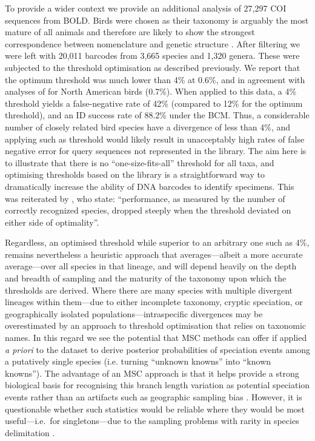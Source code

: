 \documentclass[12pt]{article}
\begin{document}
To provide a wider context we provide an additional analysis of 27,297 COI sequences from BOLD. Birds were chosen as their taxonomy is arguably the most mature of all animals and therefore are likely to show the strongest correspondence between nomenclature and genetic structure \citep{Hebert2004}. After filtering we were left with 20,011 barcodes from 3,665 species and 1,320 genera. These were subjected to the threshold optimisation as described previously. We report that the optimum threshold was much lower than 4\% at 0.6\%, and in agreement with analyses of \citep{Ratnasingham2013} for North American birds (0.7\%). When applied to this data, a 4\% threshold yields a false-negative rate of 42\% (compared to 12\% for the optimum threshold), and an ID success rate of 88.2\% under the BCM. Thus, a considerable number of closely related bird species have a divergence of less than 4\%, and applying such as threshold would likely result in unacceptably high rates of false negative error for query sequences not represented in the library. The aim here is to illustrate that there is no ``one-size-fits-all'' threshold for all taxa, and optimising thresholds based on the library is a straightforward way to dramatically increase the ability of DNA barcodes to identify specimens. This was reiterated by \citep{Ratnasingham2013}, who state: ``performance, as measured by the number of correctly recognized species, dropped steeply when the threshold deviated on either side of optimality''.

Regardless, an optimised threshold while superior to an arbitrary one such as 4\%, remains nevertheless a heuristic approach that averages---albeit a more accurate average---over all species in that lineage, and will depend heavily on the depth and breadth of sampling and the maturity of the taxonomy upon which the thresholds are derived. Where there are many species with multiple divergent lineages within them---due to either incomplete taxonomy, cryptic speciation, or geographically isolated populations---intraspecific divergences may be overestimated by an approach to threshold optimisation that relies on taxonomic names. In this regard we see the potential that MSC methods can offer if applied \emph{a priori} to the dataset to derive posterior probabilities of speciation events among a putatively single species (i.e. turning ``unknown knowns'' into ``known knowns''). The advantage of an MSC approach is that it helps provide a strong biological basis for recognising this branch length variation as potential speciation events rather than an artifacts such as geographic sampling bias \citep{Bergsten2012}. However, it is questionable whether such statistics would be reliable where they would be most useful---i.e.\ for singletons---due to the sampling problems with rarity in species delimitation \citep{Meier2011}.
\end{document}
